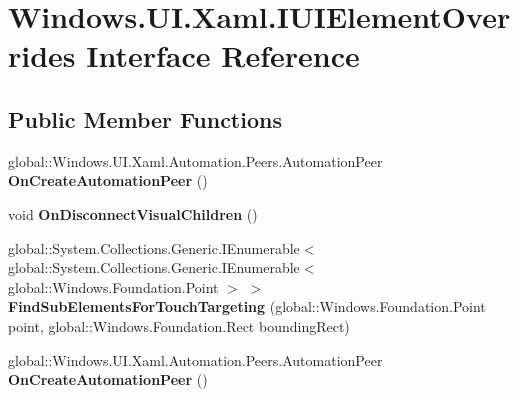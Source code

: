 \hypertarget{interface_windows_1_1_u_i_1_1_xaml_1_1_i_u_i_element_overrides}{}\section{Windows.\+U\+I.\+Xaml.\+I\+U\+I\+Element\+Overrides Interface Reference}
\label{interface_windows_1_1_u_i_1_1_xaml_1_1_i_u_i_element_overrides}
\subsection*{Public Member Functions}
\begin{DoxyCompactItemize}
\item 
\mbox{\label{interface_windows_1_1_u_i_1_1_xaml_1_1_i_u_i_element_overrides_ab9b9f7e630841a2f31a5fcc322e5d783}} 
global\+::\+Windows.\+U\+I.\+Xaml.\+Automation.\+Peers.\+Automation\+Peer {\bfseries On\+Create\+Automation\+Peer} ()
\item 
\mbox{\label{interface_windows_1_1_u_i_1_1_xaml_1_1_i_u_i_element_overrides_aa24ecfd911511d1d3d8e9156c62ed212}} 
void {\bfseries On\+Disconnect\+Visual\+Children} ()
\item 
\mbox{\label{interface_windows_1_1_u_i_1_1_xaml_1_1_i_u_i_element_overrides_a5714beae53dfcb7b4ec4a10f33a9677c}} 
global\+::\+System.\+Collections.\+Generic.\+I\+Enumerable$<$ global\+::\+System.\+Collections.\+Generic.\+I\+Enumerable$<$ global\+::\+Windows.\+Foundation.\+Point $>$ $>$ {\bfseries Find\+Sub\+Elements\+For\+Touch\+Targeting} (global\+::\+Windows.\+Foundation.\+Point point, global\+::\+Windows.\+Foundation.\+Rect bounding\+Rect)
\item 
\mbox{\label{interface_windows_1_1_u_i_1_1_xaml_1_1_i_u_i_element_overrides_ab9b9f7e630841a2f31a5fcc322e5d783}} 
global\+::\+Windows.\+U\+I.\+Xaml.\+Automation.\+Peers.\+Automation\+Peer {\bfseries On\+Create\+Automation\+Peer} ()
\item 
\mbox{\label{interface_windows_1_1_u_i_1_1_xaml_1_1_i_u_i_element_overrides_aa24ecfd911511d1d3d8e9156c62ed212}} 

\end{DoxyCompactItemize}
